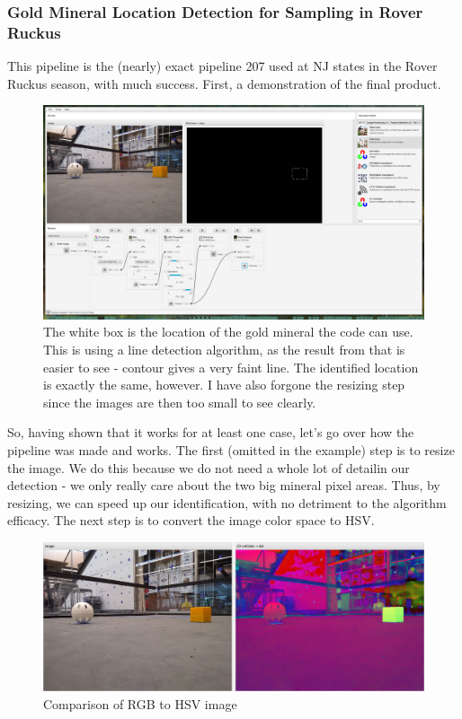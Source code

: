 \documentclass[../main.tex]{subfiles}
\begin{document}
\subsubsection{Gold Mineral Location Detection for Sampling in Rover Ruckus}
This pipeline is the (nearly) exact pipeline 207 used at NJ states in the Rover Ruckus season, with much success. First, a demonstration of the final product.
\begin{figure}[H]
    \centering
    \includegraphics[width=400pt]{sections/vision/images/opencv/gold_grip_screenshot.png}
    \caption{The white box is the location of the gold mineral the code can use. This is using a line detection algorithm, as the result from that is easier to see - contour gives a very faint line. The identified location is exactly the same, however. I have also forgone the resizing step since the images are then too small to see clearly.}
\end{figure}
So, having shown that it works for at least one case, let's go over how the pipeline was made and works. The first (omitted in the example) step is to resize the image. We do this because we do not need a whole lot of detailin our detection - we only really care about the two big mineral pixel areas. Thus, by resizing, we can speed up our identification, with no detriment to the algorithm efficacy. The next step is to convert the image color space to HSV. 
\begin{figure}[H]
    \centering
    \includegraphics[width=400pt]{sections/vision/images/opencv/gold_pipeline_cvtColor.png}
    \caption{Comparison of RGB to HSV image}
\end{figure}
\end{document}
